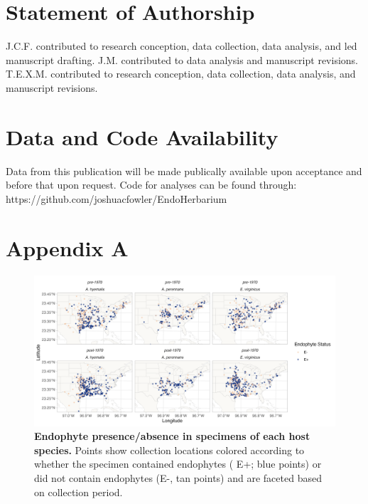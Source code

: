\documentclass[11pt]{article}
\begin{document}
	
	\section*{Statement of Authorship}
J.C.F. contributed to research conception, data collection, data analysis, and led manuscript drafting.
J.M. contributed to data analysis and manuscript revisions.
T.E.X.M. contributed to research conception, data collection, data analysis, and manuscript revisions.

	
	\section*{Data and Code Availability}
	Data from this publication will be made publically available upon acceptance and before that upon request.
	Code for analyses can be found through: https://github.com/joshuacfowler/EndoHerbarium
	
	\section*{Appendix A}
	\renewcommand{\thefigure}{A\arabic{figure}}
	\setcounter{figure}{0}
	
		\renewcommand{\thetable}{A\arabic{table}}
	\setcounter{equation}{0}  %
	\setcounter{figure}{0}
	\setcounter{table}{0}
	
	\begin{figure}[H]
		\centering
		\includegraphics[width = \linewidth]{../Plots/endo_status_map.png}
		\caption{\textbf{Endophyte presence/absence in specimens of each host species.} Points show collection locations colored according to whether the specimen contained endophytes ( E+; blue points) or did not contain endophytes (E-, tan points) and are faceted based on collection period.}
		\label{fig:endo_status_map}
	\end{figure}
	
\end{document}
